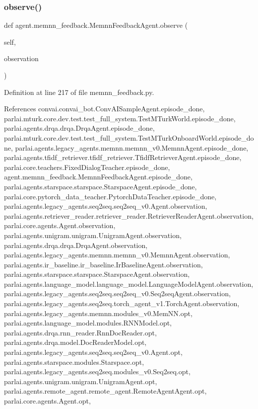 \subsubsection{\texorpdfstring{observe()}{observe()}}
{\footnotesize\ttfamily def agent.\+memnn\+\_\+feedback.\+Memnn\+Feedback\+Agent.\+observe (\begin{DoxyParamCaption}\item[{}]{self,  }\item[{}]{observation }\end{DoxyParamCaption})}



Definition at line 217 of file memnn\+\_\+feedback.\+py.



References convai.\+convai\+\_\+bot.\+Conv\+A\+I\+Sample\+Agent.\+episode\+\_\+done, parlai.\+mturk.\+core.\+dev.\+test.\+test\+\_\+full\+\_\+system.\+Test\+M\+Turk\+World.\+episode\+\_\+done, parlai.\+agents.\+drqa.\+drqa.\+Drqa\+Agent.\+episode\+\_\+done, parlai.\+mturk.\+core.\+dev.\+test.\+test\+\_\+full\+\_\+system.\+Test\+M\+Turk\+Onboard\+World.\+episode\+\_\+done, parlai.\+agents.\+legacy\+\_\+agents.\+memnn.\+memnn\+\_\+v0.\+Memnn\+Agent.\+episode\+\_\+done, parlai.\+agents.\+tfidf\+\_\+retriever.\+tfidf\+\_\+retriever.\+Tfidf\+Retriever\+Agent.\+episode\+\_\+done, parlai.\+core.\+teachers.\+Fixed\+Dialog\+Teacher.\+episode\+\_\+done, agent.\+memnn\+\_\+feedback.\+Memnn\+Feedback\+Agent.\+episode\+\_\+done, parlai.\+agents.\+starspace.\+starspace.\+Starspace\+Agent.\+episode\+\_\+done, parlai.\+core.\+pytorch\+\_\+data\+\_\+teacher.\+Pytorch\+Data\+Teacher.\+episode\+\_\+done, parlai.\+agents.\+legacy\+\_\+agents.\+seq2seq.\+seq2seq\+\_\+v0.\+Agent.\+observation, parlai.\+agents.\+retriever\+\_\+reader.\+retriever\+\_\+reader.\+Retriever\+Reader\+Agent.\+observation, parlai.\+core.\+agents.\+Agent.\+observation, parlai.\+agents.\+unigram.\+unigram.\+Unigram\+Agent.\+observation, parlai.\+agents.\+drqa.\+drqa.\+Drqa\+Agent.\+observation, parlai.\+agents.\+legacy\+\_\+agents.\+memnn.\+memnn\+\_\+v0.\+Memnn\+Agent.\+observation, parlai.\+agents.\+ir\+\_\+baseline.\+ir\+\_\+baseline.\+Ir\+Baseline\+Agent.\+observation, parlai.\+agents.\+starspace.\+starspace.\+Starspace\+Agent.\+observation, parlai.\+agents.\+language\+\_\+model.\+language\+\_\+model.\+Language\+Model\+Agent.\+observation, parlai.\+agents.\+legacy\+\_\+agents.\+seq2seq.\+seq2seq\+\_\+v0.\+Seq2seq\+Agent.\+observation, parlai.\+agents.\+legacy\+\_\+agents.\+seq2seq.\+torch\+\_\+agent\+\_\+v1.\+Torch\+Agent.\+observation, parlai.\+agents.\+legacy\+\_\+agents.\+memnn.\+modules\+\_\+v0.\+Mem\+N\+N.\+opt, parlai.\+agents.\+language\+\_\+model.\+modules.\+R\+N\+N\+Model.\+opt, parlai.\+agents.\+drqa.\+rnn\+\_\+reader.\+Rnn\+Doc\+Reader.\+opt, parlai.\+agents.\+drqa.\+model.\+Doc\+Reader\+Model.\+opt, parlai.\+agents.\+legacy\+\_\+agents.\+seq2seq.\+seq2seq\+\_\+v0.\+Agent.\+opt, parlai.\+agents.\+starspace.\+modules.\+Starspace.\+opt, parlai.\+agents.\+legacy\+\_\+agents.\+seq2seq.\+modules\+\_\+v0.\+Seq2seq.\+opt, parlai.\+agents.\+unigram.\+unigram.\+Unigram\+Agent.\+opt, parlai.\+agents.\+remote\+\_\+agent.\+remote\+\_\+agent.\+Remote\+Agent\+Agent.\+opt, parlai.\+core.\+agents.\+Agent.\+opt, 
